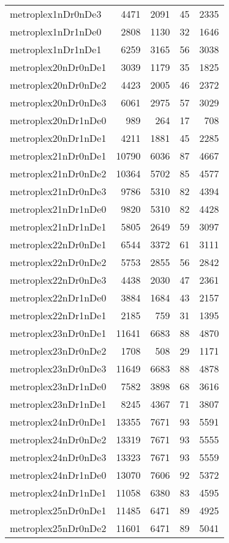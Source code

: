 \begin{longtable}{lrrrr}
metroplex1nDr0nDe3 & 4471 & 2091 & 45 & 2335 \\
metroplex1nDr1nDe0 & 2808 & 1130 & 32 & 1646 \\
metroplex1nDr1nDe1 & 6259 & 3165 & 56 & 3038 \\
metroplex20nDr0nDe1 & 3039 & 1179 & 35 & 1825 \\
metroplex20nDr0nDe2 & 4423 & 2005 & 46 & 2372 \\
metroplex20nDr0nDe3 & 6061 & 2975 & 57 & 3029 \\
metroplex20nDr1nDe0 & 989 & 264 & 17 & 708 \\
metroplex20nDr1nDe1 & 4211 & 1881 & 45 & 2285 \\
metroplex21nDr0nDe1 & 10790 & 6036 & 87 & 4667 \\
metroplex21nDr0nDe2 & 10364 & 5702 & 85 & 4577 \\
metroplex21nDr0nDe3 & 9786 & 5310 & 82 & 4394 \\
metroplex21nDr1nDe0 & 9820 & 5310 & 82 & 4428 \\
metroplex21nDr1nDe1 & 5805 & 2649 & 59 & 3097 \\
metroplex22nDr0nDe1 & 6544 & 3372 & 61 & 3111 \\
metroplex22nDr0nDe2 & 5753 & 2855 & 56 & 2842 \\
metroplex22nDr0nDe3 & 4438 & 2030 & 47 & 2361 \\
metroplex22nDr1nDe0 & 3884 & 1684 & 43 & 2157 \\
metroplex22nDr1nDe1 & 2185 & 759 & 31 & 1395 \\
metroplex23nDr0nDe1 & 11641 & 6683 & 88 & 4870 \\
metroplex23nDr0nDe2 & 1708 & 508 & 29 & 1171 \\
metroplex23nDr0nDe3 & 11649 & 6683 & 88 & 4878 \\
metroplex23nDr1nDe0 & 7582 & 3898 & 68 & 3616 \\
metroplex23nDr1nDe1 & 8245 & 4367 & 71 & 3807 \\
metroplex24nDr0nDe1 & 13355 & 7671 & 93 & 5591 \\
metroplex24nDr0nDe2 & 13319 & 7671 & 93 & 5555 \\
metroplex24nDr0nDe3 & 13323 & 7671 & 93 & 5559 \\
metroplex24nDr1nDe0 & 13070 & 7606 & 92 & 5372 \\
metroplex24nDr1nDe1 & 11058 & 6380 & 83 & 4595 \\
metroplex25nDr0nDe1 & 11485 & 6471 & 89 & 4925 \\
metroplex25nDr0nDe2 & 11601 & 6471 & 89 & 5041 \\

\end{longtable}
